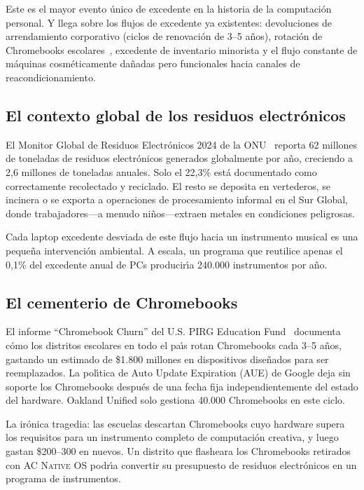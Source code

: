 \documentclass[10pt,letterpaper,twocolumn]{article}
\newcommand{\acos}{\textsc{AC Native OS}}
\begin{document}
Este es el mayor evento \'{u}nico de excedente en la historia de la computaci\'{o}n personal. Y llega sobre los flujos de excedente ya existentes: devoluciones de arrendamiento corporativo (ciclos de renovaci\'{o}n de 3--5 a\~{n}os), rotaci\'{o}n de Chromebooks escolares~\citep{pirg2023chromebook}, excedente de inventario minorista y el flujo constante de m\'{a}quinas cosm\'{e}ticamente da\~{n}adas pero funcionales hacia canales de reacondicionamiento.

\subsection{El contexto global de los residuos electr\'{o}nicos}

El Monitor Global de Residuos Electr\'{o}nicos 2024 de la ONU~\citep{forti2024ewaste} reporta 62 millones de toneladas de residuos electr\'{o}nicos generados globalmente por a\~{n}o, creciendo a 2,6 millones de toneladas anuales. Solo el 22,3\% est\'{a} documentado como correctamente recolectado y reciclado. El resto se deposita en vertederos, se incinera o se exporta a operaciones de procesamiento informal en el Sur Global, donde trabajadores---a menudo ni\~{n}os---extraen metales en condiciones peligrosas.

Cada laptop excedente desviada de este flujo hacia un instrumento musical es una peque\~{n}a intervenci\'{o}n ambiental. A escala, un programa que reutilice apenas el 0,1\% del excedente anual de PCs producir\'{\i}a 240.000 instrumentos por a\~{n}o.

\subsection{El cementerio de Chromebooks}

El informe ``Chromebook Churn'' del U.S. PIRG Education Fund~\citep{pirg2023chromebook} documenta c\'{o}mo los distritos escolares en todo el pa\'{\i}s rotan Chromebooks cada 3--5 a\~{n}os, gastando un estimado de \$1.800 millones en dispositivos dise\~{n}ados para ser reemplazados. La pol\'{\i}tica de Auto Update Expiration (AUE) de Google deja sin soporte los Chromebooks despu\'{e}s de una fecha fija independientemente del estado del hardware. Oakland Unified solo gestiona 40.000 Chromebooks en este ciclo.

La ir\'{o}nica tragedia: las escuelas descartan Chromebooks cuyo hardware supera los requisitos para un instrumento completo de computaci\'{o}n creativa, y luego gastan \$200--300 en nuevos. Un distrito que flasheara los Chromebooks retirados con \acos{} podr\'{\i}a convertir su presupuesto de residuos electr\'{o}nicos en un programa de instrumentos.
\end{document}
